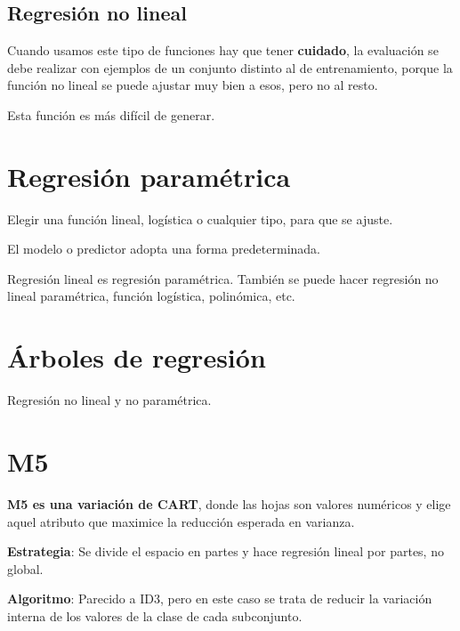 \documentclass[12pt, twoside, openright]{report} %
\begin{document}
\subsection{Regresión no lineal}

Cuando usamos este tipo de funciones hay que tener \textbf{cuidado}, la
evaluación se debe realizar con ejemplos de un conjunto distinto al de
entrenamiento, porque la función no lineal se puede ajustar muy bien a
esos, pero no al resto.

Esta función es más difícil de generar.

\section{Regresión paramétrica}

Elegir una función lineal, logística o cualquier tipo, para que se ajuste.

El modelo o predictor adopta una forma predeterminada.

Regresión lineal es regresión paramétrica. También se puede hacer
regresión no lineal paramétrica, función logística, polinómica, etc.

\section{Árboles de regresión}

Regresión no lineal y no paramétrica.

\section{M5}

\textbf{M5 es una variación de CART}, donde las hojas son valores numéricos y
elige aquel atributo que maximice la reducción esperada en varianza.

\textbf{Estrategia}: Se divide el espacio en partes y hace regresión
lineal por partes, no global.

\textbf{Algoritmo}: Parecido a ID3, pero en este caso se trata de
reducir la variación interna de los valores de la clase de cada
subconjunto.
\end{document}
